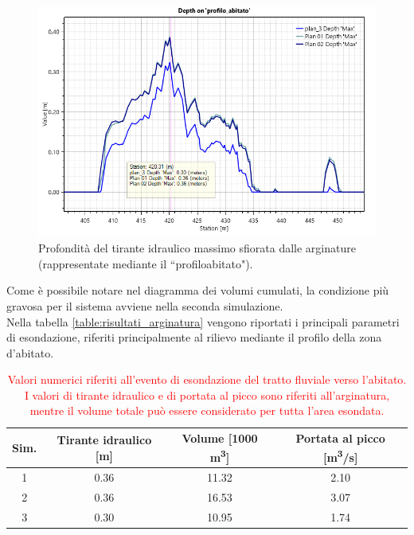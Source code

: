 \begin{figure}[H] \centering
    \includegraphics[scale=0.5]{immagini/depth_profilo_abitato.png}
    \caption{Profondità del tirante idraulico massimo sfiorata dalle arginature (rappresentate mediante il ``profilo\textunderscore abitato").}
    \label{figure:depth_profilo_abitato}
\end{figure}

Come è possibile notare nel diagramma dei volumi cumulati, la condizione più gravosa per il sistema avviene nella seconda simulazione.\\
Nella tabella \eqref{table:risultati_arginatura} vengono riportati i principali parametri di esondazione, riferiti principalmente al rilievo mediante il profilo della zona d'abitato.
\begin{table}[hbt]\centering
    \caption{\textcolor{red}{Valori numerici riferiti all'evento di esondazione del tratto fluviale verso l'abitato. I valori di tirante idraulico e di portata al picco sono riferiti all'arginatura, mentre il volume totale può essere considerato per tutta l'area esondata.}}
    \begin{tabular}{cccc}
    \toprule
    Sim. & Tirante idraulico [m] & Volume [1000 \unit{m^3}] & Portata al picco [\unit{m^3/s}] \\
    \midrule
    1 & 0.36 & 11.32 &   2.10\\
    2 & 0.36 & 16.53 & 3.07  \\
    3 & 0.30 & 10.95 & 1.74  \\
    \bottomrule
    \end{tabular}
    \label{table:risultati_arginatura}
    \end{table}

